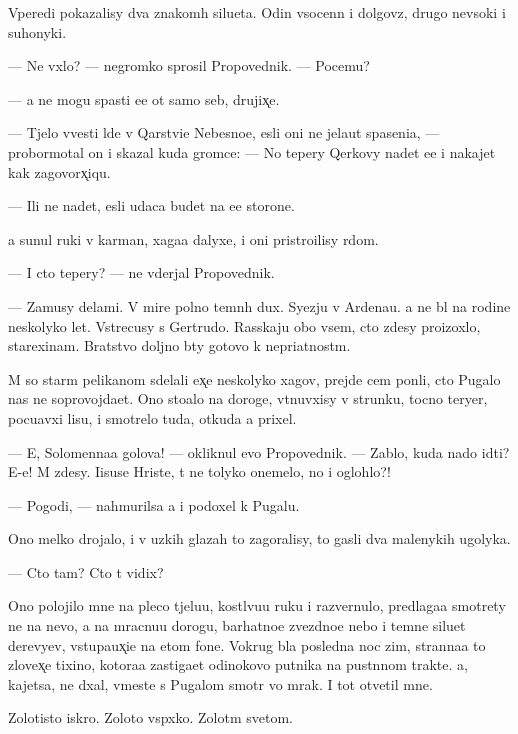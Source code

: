 \documentclass[10pt]{book}
\begin{document}
Vperedi pokazalisy dva znakom{\yi}h silueta. Odin v{\yi}socenn{\yi}{\y} i dolgov{\ia}z{\yi}{\y}, drugo{\y} nev{\yi}soki{\y} i suhonyki{\y}.

— Ne v{\yi}xlo? — negromko sprosil Propovednik. — Pocemu?

— {\Y}a ne mogu spasti {\y}e{\y}e ot samo{\y} seb{\ia}, drujix̨e.

— T{\ia}jelo vvesti l{\iu}de{\y} v Qarstvi{\y}e Nebesno{\y}e, {\y}esli oni ne jela{\y}ut spaseni{\y}a, — probormotal on i skazal kuda gromce: — No tepery Qerkovy na{\y}det {\y}e{\y}e i nakajet kak zagovorx̨iqu.

— Ili ne na{\y}det, {\y}esli udaca budet na {\y}e{\y}e storone.

{\Y}a sunul ruki v karman{\yi}, xaga{\y}a dalyxe, i oni pristro{\y}ilisy r{\ia}dom.

— I cto tepery? — ne v{\yi}derjal Propovednik.

— Za{\y}musy delami. V mire polno temn{\yi}h dux. Syezju v Ardenau. {\Y}a ne b{\yi}l na rodine neskolyko let. Vstrecusy s Gertrudo{\y}. Rasskaju obo vsem, cto zdesy pro{\y}izoxlo, stare{\y}xinam. Bratstvo doljno b{\yi}ty gotovo k nepri{\y}atnost{\ia}m.

M{\yi} so star{\yi}m pelikanom sdelali {\y}ex̨e neskolyko xagov, prejde cem pon{\ia}li, cto Pugalo nas ne soprovojda{\y}et. Ono sto{\y}alo na doroge, v{\yi}t{\ia}nuvxisy v strunku, tocno teryer, pocu{\y}avxi{\y} lisu, i smotrelo tuda, otkuda {\y}a prixel.

— E{\y}, Solomenna{\y}a golova! — okliknul {\y}evo Propovednik. — Zab{\yi}lo, kuda nado idti? E-e{\y}! M{\yi} zdesy. Iisuse Hriste, t{\yi} ne tolyko onemelo, no i oglohlo?!

— Pogodi, — nahmurilsa {\y}a i podoxel k Pugalu.

Ono melko drojalo, i v uzkih glazah to zagoralisy, to gasli dva malenykih ugolyka.

— Cto tam? Cto t{\yi} vidix?

Ono polojilo mne na pleco t{\ia}jelu{\y}u, kostl{\ia}vu{\y}u ruku i razvernulo, predlaga{\y}a smotrety ne na nevo, a na mracnu{\y}u dorogu, barhatno{\y}e zvezdno{\y}e nebo i temn{\yi}{\y}e siluet{\yi} derevyev, v{\yi}stupa{\y}ux̨i{\y}e na etom fone. Vokrug b{\yi}la posledn{\ia}{\y}a noc zim{\yi}, stranna{\y}a to{\y} zlovex̨e{\y} tixino{\y}, kotora{\y}a zastiga{\y}et odinokovo putnika na pust{\yi}nnom trakte. {\Y}a, kajetsa, ne d{\yi}xal, vmeste s Pugalom smotr{\ia} vo mrak. I tot otvetil mne.

Zolotisto{\y} iskro{\y}. Zoloto{\y} vsp{\yi}xko{\y}. Zolot{\yi}m svetom.
\end{document}
